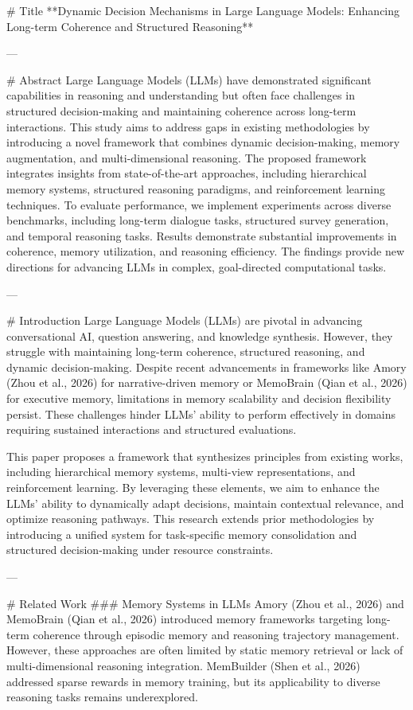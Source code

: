 # Title  
**Dynamic Decision Mechanisms in Large Language Models: Enhancing Long-term Coherence and Structured Reasoning**

---

# Abstract  
Large Language Models (LLMs) have demonstrated significant capabilities in reasoning and understanding but often face challenges in structured decision-making and maintaining coherence across long-term interactions. This study aims to address gaps in existing methodologies by introducing a novel framework that combines dynamic decision-making, memory augmentation, and multi-dimensional reasoning. The proposed framework integrates insights from state-of-the-art approaches, including hierarchical memory systems, structured reasoning paradigms, and reinforcement learning techniques. To evaluate performance, we implement experiments across diverse benchmarks, including long-term dialogue tasks, structured survey generation, and temporal reasoning tasks. Results demonstrate substantial improvements in coherence, memory utilization, and reasoning efficiency. The findings provide new directions for advancing LLMs in complex, goal-directed computational tasks.

---

# Introduction  
Large Language Models (LLMs) are pivotal in advancing conversational AI, question answering, and knowledge synthesis. However, they struggle with maintaining long-term coherence, structured reasoning, and dynamic decision-making. Despite recent advancements in frameworks like Amory (Zhou et al., 2026) for narrative-driven memory or MemoBrain (Qian et al., 2026) for executive memory, limitations in memory scalability and decision flexibility persist. These challenges hinder LLMs' ability to perform effectively in domains requiring sustained interactions and structured evaluations. 

This paper proposes a framework that synthesizes principles from existing works, including hierarchical memory systems, multi-view representations, and reinforcement learning. By leveraging these elements, we aim to enhance the LLMs' ability to dynamically adapt decisions, maintain contextual relevance, and optimize reasoning pathways. This research extends prior methodologies by introducing a unified system for task-specific memory consolidation and structured decision-making under resource constraints.

---

# Related Work  
### Memory Systems in LLMs  
Amory (Zhou et al., 2026) and MemoBrain (Qian et al., 2026) introduced memory frameworks targeting long-term coherence through episodic memory and reasoning trajectory management. However, these approaches are often limited by static memory retrieval or lack of multi-dimensional reasoning integration. MemBuilder (Shen et al., 2026) addressed sparse rewards in memory training, but its applicability to diverse reasoning tasks remains underexplored.


